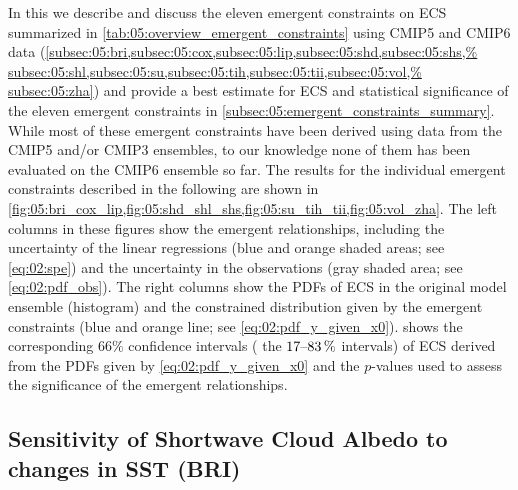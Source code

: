 In this  we describe and
discuss the eleven emergent constraints on \ac{ECS} summarized in
\cref{tab:05:overview_emergent_constraints} using \acs{CMIP}5 and \acs{CMIP}6
data
(\cref{subsec:05:bri,subsec:05:cox,subsec:05:lip,subsec:05:shd,subsec:05:shs,%
  subsec:05:shl,subsec:05:su,subsec:05:tih,subsec:05:tii,subsec:05:vol,%
  subsec:05:zha}) and provide a best estimate for \ac{ECS} and statistical
significance of the eleven emergent constraints in
\cref{subsec:05:emergent_constraints_summary}. While most of these emergent
constraints have been derived using data from the \acs{CMIP}5 and/or
\acs{CMIP}3 ensembles, to our knowledge none of them has been evaluated on
the \acs{CMIP}6 ensemble so far. The results for the individual emergent
constraints described in the following are shown in
\cref{fig:05:bri_cox_lip,fig:05:shd_shl_shs,fig:05:su_tih_tii,fig:05:vol_zha}.
The left columns in these figures show the emergent relationships, including
the uncertainty of the linear regressions (blue and orange shaded areas; see
\cref{eq:02:spe}) and the uncertainty in the observations (gray shaded area;
see \cref{eq:02:pdf_obs}). The right columns show the \acp{PDF} of \ac{ECS} in
the original model ensemble (histogram) and the constrained distribution given
by the emergent constraints (blue and orange line; see
\cref{eq:02:pdf_y_given_x0}).  shows the
corresponding $66 \unit{\%}$ confidence intervals (\ie{} the
$\rangeunit{17}{83}{\%}$ intervals) of \ac{ECS} derived from the \acp{PDF}
given by \cref{eq:02:pdf_y_given_x0} and the $p$-values used to assess the
significance of the emergent relationships.


\subsection{Sensitivity of Shortwave Cloud Albedo to changes in \acl{SST}
  (BRI)}
\label{subsec:05:bri}

